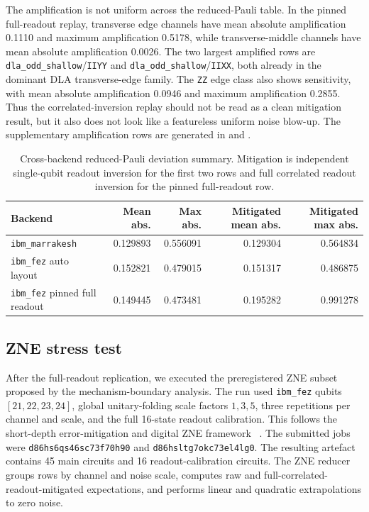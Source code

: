 \documentclass[preprint,aps,physrev,superscriptaddress,floatfix,longbibliography]{revtex4-2}
\begin{document}
The amplification is not uniform across the reduced-Pauli table. In the
pinned full-readout replay, transverse edge channels have mean absolute
amplification 0.1110 and maximum amplification 0.5178, while transverse-middle
channels have mean absolute amplification 0.0026. The two largest amplified
rows are \texttt{dla\_odd\_shallow}/\texttt{IIYY} and
\texttt{dla\_odd\_shallow}/\texttt{IIXX}, both already in the dominant
DLA transverse-edge family. The \texttt{ZZ} edge class also shows
sensitivity, with mean absolute amplification 0.0946 and maximum
amplification 0.2855. Thus the correlated-inversion replay should not be read
as a clean mitigation result, but it also does not look like a featureless
uniform noise blow-up. The supplementary amplification rows are generated in
and
.

\begin{table}[tb]
\centering
\small
\begin{tabular}{lrrrr}
\toprule
Backend & Mean abs. & Max abs. & Mitigated mean abs. & Mitigated max abs. \\
\midrule
\texttt{ibm\_marrakesh} & 0.129893 & 0.556091 & 0.129304 & 0.564834 \\
\texttt{ibm\_fez} auto layout & 0.152821 & 0.479015 & 0.151317 & 0.486875 \\
\texttt{ibm\_fez} pinned full readout & 0.149445 & 0.473481 & 0.195282 & 0.991278 \\
\bottomrule
\end{tabular}
\caption{Cross-backend reduced-Pauli deviation summary. Mitigation is
independent single-qubit readout inversion for the first two rows and full
correlated readout inversion for the pinned full-readout row.}
\label{tab:backend-comparison}
\end{table}

\subsection{ZNE stress test}

After the full-readout replication, we executed the preregistered ZNE subset
proposed by the mechanism-boundary analysis. The run used \texttt{ibm\_fez}
qubits $[21,22,23,24]$, global unitary-folding scale factors $1,3,5$, three
repetitions per channel and scale, and the full 16-state readout calibration.
This follows the short-depth error-mitigation and digital ZNE framework
~\cite{Temme2017,LiBenjamin2017,Endo2021,GiurgicaTiron2020}.
The submitted jobs were \texttt{d86hs6qs46sc73f70h90} and
\texttt{d86hsltg7okc73el4lg0}. The resulting artefact contains 45 main
circuits and 16 readout-calibration circuits. The ZNE reducer groups rows by
channel and noise scale, computes raw and full-correlated-readout-mitigated
expectations, and performs linear and quadratic extrapolations to zero noise.
\end{document}
